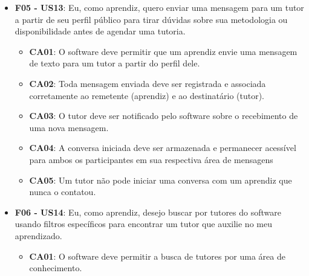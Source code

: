 \begin{itemize}
\begin{itemize}
\item \textbf{CA03}: Se um usuário atua como tutor e aprendiz, seu perfil deve exibir claramente duas médias de nota separadas: uma para sua atuação como ``Tutor'' e outra como ``Aprendiz''.

\item \textbf{CA04}: O perfil deve listar os comentários individuais recebidos, junto com a nota correspondente àquele comentário e o nome de quem avaliou.

\end{itemize}

\item \textbf{F05 - US13}: Eu, como aprendiz, quero enviar uma mensagem para um tutor a partir de seu perfil público para tirar dúvidas sobre sua metodologia ou disponibilidade antes de agendar uma tutoria.

\begin{itemize}

\item \textbf{CA01}: O software deve permitir que um aprendiz envie uma mensagem de texto para um tutor a partir do perfil dele.

\item \textbf{CA02}: Toda mensagem enviada deve ser registrada e associada corretamente ao remetente (aprendiz) e ao destinatário (tutor).

\item \textbf{CA03}: O tutor deve ser notificado pelo software sobre o recebimento de uma nova mensagem.

\item \textbf{CA04}: A conversa iniciada deve ser armazenada e permanecer acessível para ambos os participantes em sua respectiva área de mensagens

\item \textbf{CA05}: Um tutor não pode iniciar uma conversa com um aprendiz que nunca o contatou.

\end{itemize}


\item \textbf{F06 - US14}: Eu, como aprendiz, desejo buscar por tutores do software usando filtros específicos para encontrar um tutor que auxilie no meu aprendizado.

\begin{itemize}

\item \textbf{CA01}: O software deve permitir a busca de tutores por uma área de conhecimento.


\end{itemize}
\end{itemize}

